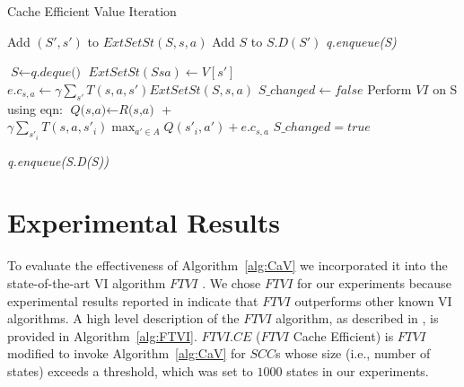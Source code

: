 \documentclass[conference]{IEEEtran}
\begin{document}
\begin{algorithm}
\caption{Cache Efficient Value Iteration}
\label{alg:CaV}
\begin{algorithmic}[1]
	\label{alg:CaV:setupStart}
		\State Add $(S',s')$ to $ExtSetSt(S,s,a)$
		\State Add $S$ to $S.D(S')$
	\EndFor
\State \textit{q.enqueue(S)}
\EndFor	\label{alg:CaV:setupEnd}

	\label{alg:CaV:cachedAlg}
	\State $\textit{S} \leftarrow \textit{q.deque()}$
		\State  $ExtSetSt(Ssa) \gets V[s']$
		\label{alg:CaV:extStates}
	\EndFor
		\State $e.c_{s,a} \gets \gamma \sum\limits_{s'} T(s,a,s') ExtSetSt(S,s,a)$
	\EndFor
	\State $\textit{S\_changed} \leftarrow false$
	\State Perform $VI$ on S using eqn:
	\State $\textit{Q(s,a)} \leftarrow \textit{R(s,a)}$ + \\
		  $\gamma \sum\limits_{s'_{i}} T(s,a,s'_{i})  {\displaystyle\max_{a'\in A} } Q(s'_{i},a') + e.c_{s,a}$ 
			\label{alg:CaV:finalEqn}
		\State $S\_changed = true$
	\EndIf

		\State \textit{q.enqueue(S.D(S))}
	\EndIf
\EndWhile \label{alg:CaV:cachedAlgEnd}
\end{algorithmic}
\end{algorithm}

\section{Experimental Results}
\label{sec:exp}
To evaluate the effectiveness of Algorithm~\ref{alg:CaV} we incorporated it
into the state-of-the-art VI algorithm $FTVI$ \cite{b10}.
We chose $FTVI$ for our experiments because experimental results reported in \cite{b10} indicate that $FTVI$ outperforms other known VI algorithms.
A high level description of the $FTVI$ algorithm, as described in \cite{b10}, is provided in Algorithm~\ref{alg:FTVI}.
$FTVI.CE$ ($FTVI$ Cache Efficient) is $FTVI$ modified to invoke Algorithm~\ref{alg:CaV} for $SCC$s whose size (i.e., number of states) exceeds a threshold, which was set to $1000$ states in our experiments.
\end{document}
